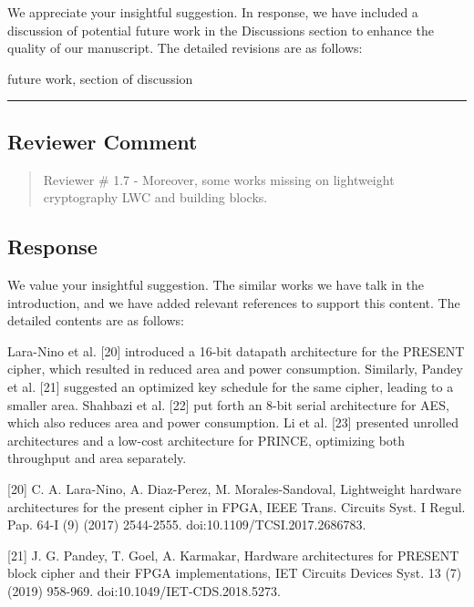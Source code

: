 We appreciate your insightful suggestion. In response, we have included a discussion of potential future work in the Discussions section to enhance the quality of our manuscript. The detailed revisions are as follows:

\color{blue}

future work, section of discussion

\color{black}

\noindent\rule{\linewidth}{2.0pt}

\subsection{Reviewer Comment}
\begin{mdframed}
	\begin{quote}
		Reviewer \# 1.7 - Moreover, some works missing on lightweight cryptography LWC and building blocks.
	\end{quote}
\end{mdframed}

\subsection{Response}

We value your insightful suggestion. The similar works we have talk in the introduction, and we have added relevant references to support this content. The detailed contents are as follows:

\color{blue}

Lara-Nino et al. [20] introduced a 16-bit datapath architecture for the PRESENT cipher, which resulted in reduced area and power consumption. Similarly, Pandey et al. [21] suggested an optimized key schedule for the same cipher, leading to a smaller area. Shahbazi et al. [22] put forth an 8-bit serial architecture for AES, which also reduces area and power consumption. Li et al. [23] presented unrolled architectures and a low-cost architecture for PRINCE, optimizing both throughput and area separately. 

[20] C. A. Lara-Nino, A. Diaz-Perez, M. Morales-Sandoval, Lightweight hardware architectures for the present cipher in FPGA, IEEE Trans. Circuits Syst. I Regul. Pap. 64-I (9) (2017) 2544-2555. doi:10.1109/TCSI.2017.2686783.

[21] J. G. Pandey, T. Goel, A. Karmakar, Hardware architectures for PRESENT block cipher and their FPGA implementations, IET Circuits Devices Syst. 13 (7) (2019) 958-969. doi:10.1049/IET-CDS.2018.5273.

